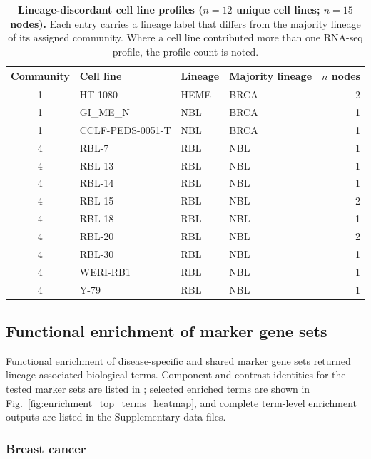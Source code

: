 \begin{table}[H]
\centering
\caption{\textbf{Lineage-discordant cell line profiles ($n = 12$ unique cell lines;
  $n = 15$ nodes).} Each entry carries a lineage label that differs from
  the majority lineage of its assigned community. Where a cell line contributed
  more than one RNA-seq profile, the profile count is noted.}
\label{tab:discordant}
\begin{tabular}{clllr}
\toprule
Community & Cell line & Lineage & Majority lineage & $n$ nodes \\
\midrule
1 & HT-1080           & HEME & BRCA & 2 \\
1 & GI\_ME\_N         & NBL & BRCA & 1 \\
1 & CCLF-PEDS-0051-T  & NBL & BRCA & 1 \\
4 & RBL-7             & RBL & NBL  & 1 \\
4 & RBL-13            & RBL & NBL  & 1 \\
4 & RBL-14            & RBL & NBL  & 1 \\
4 & RBL-15            & RBL & NBL  & 2 \\
4 & RBL-18            & RBL & NBL  & 1 \\
4 & RBL-20            & RBL & NBL  & 2 \\
4 & RBL-30            & RBL & NBL  & 1 \\
4 & WERI-RB1          & RBL & NBL  & 1 \\
4 & Y-79              & RBL & NBL  & 1 \\
\bottomrule
\end{tabular}
\end{table}


\subsection{Functional enrichment of marker gene sets}

Functional enrichment of disease-specific and shared marker gene sets
returned lineage-associated biological terms. Component and contrast
identities for the tested marker sets are listed in
; selected
enriched terms are shown in Fig.~\ref{fig:enrichment_top_terms_heatmap}, and
complete term-level enrichment outputs are listed in the Supplementary data
files.

\subsubsection{Breast cancer}

